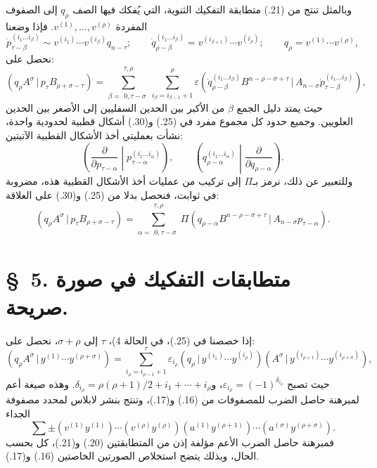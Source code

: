 \documentclass[11pt]{article}
\providecommand{\pair}[2]{(#1\,|\,#2)}
\providecommand{\eps}{\varepsilon}
\begin{document}
وبالمثل تنتج من (21.) متطابقة التفكيك الثنوية، التي يُفكك فيها الصف $q_\rho$ إلى الصفوف المفردة $v^{(1)},\ldots,v^{(\rho)}$. فإذا وضعنا
\begin{equation}
 \dot p_{\tau-\beta}^{(i_1\ldots i_\beta)}\sim v^{(i_1)}\cdots v^{(i_\beta)}q_{n-\tau};\qquad
 \dot q_{\rho-\beta}^{(i_1\ldots i_\beta)}=v^{(i_{\beta+1})}\cdots v^{(i_\rho)};\qquad
 q_\rho=v^{(1)}\cdots v^{(\rho)},
\tag{29}
\end{equation}
نحصل على:
\begin{equation}
 \pair{q_\rho A^\sigma}{p_\tau B_{\rho+\sigma-\tau}}
 =\sum_{\beta=\substack{0,\tau-\sigma}}^{\substack{\tau,\rho}}
   \sum_{i_\beta=i_{\beta-1}+1}^{\rho}\eps
\pair{\dot q_{\rho-\beta}^{(i_1\ldots i_\beta)}B^{n-\rho-\sigma+\tau}}{A_{n-\sigma}\dot p_{\tau-\beta}^{(i_1\ldots i_\beta)}} ,
\tag{30}
\end{equation}
حيث يمتد دليل الجمع $\beta$ من الأكبر بين الحدين السفليين إلى الأصغر بين الحدين العلويين. وجميع حدود كل مجموع مفرد في (25.) و(30.) أشكال قطبية لحدودية واحدة، نشأت بعمليتي أخذ الأشكال القطبية الآتيتين:
\[
\left(\frac{\partial}{\partial p_{\tau-\alpha}}\middle|p_{\tau-\alpha}^{(i_1\ldots i_\alpha)}\right),\qquad
\left(q_{\rho-\alpha}^{(i_1\ldots i_\alpha)}\middle|\frac{\partial}{\partial q_{\rho-\alpha}}\right).
\]
وللتعبير عن ذلك، نرمز بـ$\Pi$ إلى تركيب من عمليات أخذ الأشكال القطبية هذه، مضروبة في ثوابت، فنحصل بدلا من (25.) و(30.) على العلاقة:
\begin{equation}
 \pair{q_\rho A^\sigma}{p_\tau B_{\rho+\sigma-\tau}}
 =\sum_{\alpha=\substack{0,\tau-\sigma}}^{\substack{\tau,\rho}}
 \Pi\pair{q_{\rho-\alpha}B^{n-\rho-\sigma+\tau}}{A_{n-\sigma}p_{\tau-\alpha}}.
\tag{31}
\end{equation}

\section*{\S\ 5. متطابقات التفكيك في صورة صريحة.}
إذا خصصنا في (25.)، في الحالة 4)، $\tau$ إلى $\sigma+\rho$، نحصل على:
\begin{equation}
 \pair{q_\rho A^\sigma}{y^{(1)}\cdots y^{(\rho+\sigma)}}
 =\sum_{i_\rho=i_{\rho-1}+1}^{\tau}
 \eps_{i_\rho}\pair{q_\rho}{y^{(i_1)}\cdots y^{(i_\rho)}}
 \pair{A^\sigma}{y^{(i_{\rho+1})}\cdots y^{(i_{\rho+\sigma})}},
\tag{32}
\end{equation}
حيث تصبح $\eps_{i_\rho}=(-1)^{\delta_{i_\rho}}$، و$\delta_{i_\rho}=\rho(\rho+1)/2+i_1+\cdots+i_\rho$. وهذه صيغة أعم لمبرهنة حاصل الضرب للمصفوفات من (16.) و(17.)، وتنتج بنشر لابلاس لمحدد مصفوفة الجداء
\[
 \sum\pm(v^{(1)}y^{(1)})\cdots(v^{(\rho)}y^{(\rho)})(a^{(1)}y^{(\rho+1)})\cdots(a^{(\sigma)}y^{(\rho+\sigma)}).
\]
فمبرهنة حاصل الضرب الأعم مؤلفة إذن من المتطابقتين (20.) و(21.)، كل بحسب الحال، وبذلك يتضح استخلاص الصورتين الخاصتين (16.) و(17.).
\end{document}
